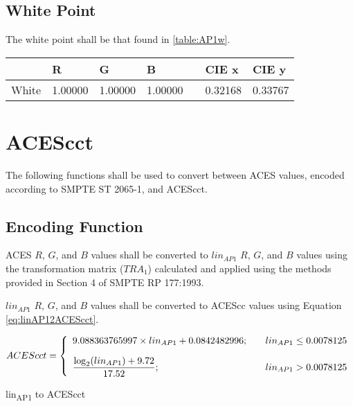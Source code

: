 \subsection{White Point}
The white point shall be that found in \autoref{table:AP1w}.

\begin{center}
\begin{tabularx}{4.5in}{XlllXll}
        & R       & G       & B       & & CIE x & CIE y \\ \hline
White   & 1.00000 & 1.00000 & 1.00000 & & 0.32168 & 0.33767 \\
\end{tabularx}
\label{table:AP1w}
\end{center}

\newpage
\section{ACEScct}
\label{sec:ACEScct}
The following functions shall be used to convert between ACES values, encoded according to SMPTE ST 2065-1, and ACEScct.

\subsection{Encoding Function}
ACES $R$, $G$, and $B$ values shall be converted to $lin_{AP1}$ $R$, $G$, and $B$ values using the transformation matrix ($TRA_{1}$) calculated and applied using the methods provided in Section 4 of SMPTE RP 177:1993.

$lin_{AP1}$ $R$, $G$, and $B$ values shall be converted to ACEScc values using Equation \ref{eq:linAP12ACEScct}.

\begin{floatequ} 
\begin{equation} 
    ACEScct = \left\{ 
    \begin{array}{l l }
        9.088363765997 \times lin_{AP1} + 0.0842482996;    & \quad lin_{AP1} \leq 0.0078125 \\[10pt]
        \dfrac{\log_{2}(lin_{AP1}) + 9.72}{17.52}; & \quad lin_{AP1} > 0.0078125 \\    
    \end{array} \right.
\end{equation}
\caption{lin\textsubscript{AP1} to ACEScct}
\label{eq:linAP12ACEScct}
\end{floatequ}


